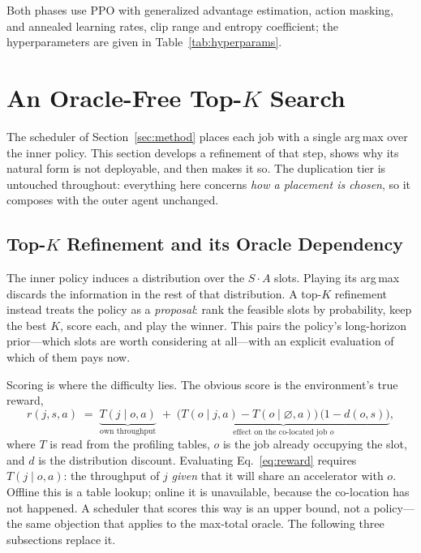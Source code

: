 \documentclass{article}
\begin{document}
Both phases use PPO with generalized advantage estimation, action masking, and
annealed learning rates, clip range and entropy coefficient; the hyperparameters
are given in Table~\ref{tab:hyperparams}.

\section{An Oracle-Free Top-$K$ Search}
\label{sec:oraclefree}

The scheduler of Section~\ref{sec:method} places each job with a single arg\,max
over the inner policy. This section develops a refinement of that step, shows why
its natural form is not deployable, and then makes it so. The duplication tier is
untouched throughout: everything here concerns \emph{how a placement is chosen},
so it composes with the outer agent unchanged.

\subsection{Top-$K$ Refinement and its Oracle Dependency}
\label{sec:topk}

The inner policy induces a distribution over the $S \cdot A$ slots. Playing its
arg\,max discards the information in the rest of that distribution. A top-$K$
refinement instead treats the policy as a \emph{proposal}: rank the feasible slots
by probability, keep the best $K$, score each, and play the winner. This pairs the
policy's long-horizon prior---which slots are worth considering at all---with an
explicit evaluation of which of them pays now.

Scoring is where the difficulty lies. The obvious score is the environment's true
reward,
\begin{equation}
r(j,s,a) \;=\; \underbrace{T\!\left(j \mid o, a\right)}_{\text{own throughput}}
\;+\; \underbrace{\bigl(T(o \mid j, a) - T(o \mid \varnothing, a)\bigr)\,
      \bigl(1 - d(o,s)\bigr)}_{\text{effect on the co-located job } o},
\label{eq:reward}
\end{equation}
where $T$ is read from the profiling tables, $o$ is the job already occupying the
slot, and $d$ is the distribution discount. Evaluating Eq.~\eqref{eq:reward}
requires $T(j \mid o, a)$: the throughput of $j$ \emph{given} that it will share an
accelerator with $o$. Offline this is a table lookup; online it is unavailable,
because the co-location has not happened. A scheduler that scores this way is an
upper bound, not a policy---the same objection that applies to the max-total
oracle. The following three subsections replace it.
\end{document}
